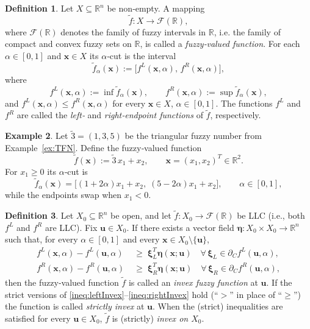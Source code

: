 \documentclass{article}
\theoremstyle{definition}
\newtheorem{maar}{Definition}[section]
\newtheorem{example}[maar]{Example}
\begin{document}
\begin{maar}
Let $X\subseteq\mathbb{R}^{n}$ be non‑empty.  
A mapping
\[
    \widetilde{f}:X \longrightarrow \mathcal{F}(\mathbb{R}),
\]
where $\mathcal{F}(\mathbb{R})$ denotes the family of fuzzy intervals in $\mathbb R$, i.e. the family of compact and convex fuzzy sets on $\mathbb{R}$, is
called a \emph{fuzzy‑valued function}.  
For each $\alpha\in[0,1]$ and $\boldsymbol x\in X$ its $\alpha$‑cut is the interval  
\[
    \widetilde{f}_{\alpha}(\boldsymbol x)
    :=\bigl[f^{L}(\boldsymbol x,\alpha),\,f^{R}(\boldsymbol x,\alpha)\bigr],
\]
where
\[
    f^{L}(\boldsymbol x,\alpha):=\inf \widetilde{f}_{\alpha}(\boldsymbol x),
    \qquad
    f^{R}(\boldsymbol x,\alpha):=\sup \widetilde{f}_{\alpha}(\boldsymbol x),
\]
and $f^{L}(\boldsymbol x,\alpha)\le f^{R}(\boldsymbol x,\alpha)$ for every
$\boldsymbol x\in X$, $\alpha\in[0,1]$.  
The functions $f^{L}$ and $f^{R}$ are called the \emph{left‑} and
\emph{right‑endpoint functions} of $\widetilde{f}$, respectively.
\end{maar}

\begin{example}\label{ex:fuzzyLinear}
Let $\widetilde{3}=(1,3,5)$ be the triangular fuzzy number from
Example~\ref{ex:TFN}.  
Define the fuzzy‑valued function
\[
    \widetilde{f}(\boldsymbol x)
    :=\widetilde{3}\,x_{1}+x_{2},
    \qquad \boldsymbol x=(x_{1},x_{2})^{T}\in\mathbb{R}^{2}.
\]
For $x_{1}\ge 0$ its $\alpha$‑cut is
\[
    \widetilde{f}_{\alpha}(\boldsymbol x)
    =\bigl[(1+2\alpha)x_{1}+x_{2},\; (5-2\alpha)x_{1}+x_{2}\bigr],
    \qquad \alpha\in[0,1],
\]
while the endpoints swap when $x_{1}<0$.
\end{example}

\begin{maar}\label{def:fuzzyInvex}
Let $X_0\subseteq\mathbb{R}^{n}$ be open, and let
$\widetilde{f}:X_0\to\mathcal{F}(\mathbb{R})$ be LLC (i.e., both $f^L$ and $f^R$ are LLC).  
Fix $\boldsymbol u\in X_0$.  
If there exists a vector field
$\boldsymbol\eta:X_0\times X_0\to\mathbb{R}^{n}$ such that, for every
$\alpha\in[0,1]$ and every $\boldsymbol x\in X_0\setminus\{\boldsymbol u\}$,
\begin{align}
    f^{L}(\boldsymbol x,\alpha)-f^{L}(\boldsymbol u,\alpha)
    &\;\ge\;
      \boldsymbol\xi_{L}^{T}\boldsymbol\eta(\boldsymbol x;\boldsymbol u)
      \quad\forall\,
      \boldsymbol\xi_{L}\in\partial_C f^{L}(\boldsymbol u,\alpha),\label{ineq:leftInvex}\\
    f^{R}(\boldsymbol x,\alpha)-f^{R}(\boldsymbol u,\alpha)
    &\;\ge\;
      \boldsymbol\xi_{R}^{T}\boldsymbol\eta(\boldsymbol x;\boldsymbol u)
      \quad\forall\,
      \boldsymbol\xi_{R}\in\partial_C f^{R}(\boldsymbol u,\alpha),\label{ineq:rightInvex}
\end{align}
then the fuzzy-valued function  $\widetilde{f}$ is called an \emph{invex fuzzy function} at $\boldsymbol u$.
If the strict versions of \eqref{ineq:leftInvex}–\eqref{ineq:rightInvex} hold
(“$>$” in place of “$\ge$”) the function is called \emph{strictly invex} at
$\boldsymbol u$.  
When the (strict) inequalities are satisfied for every
$\boldsymbol u\in X_0$, $\widetilde{f}$ is (strictly) \emph{invex on $X_0$}.
\end{maar}
\end{document}

